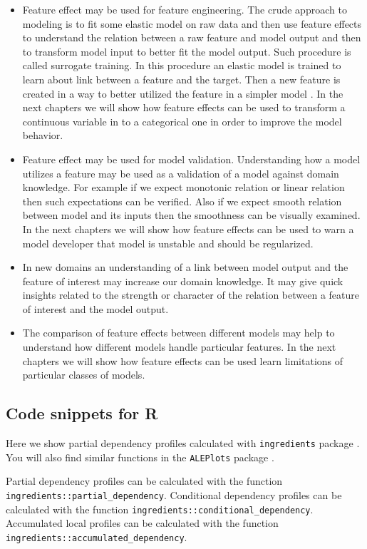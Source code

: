 \documentclass[12pt,]{krantz}
\providecommand{\tightlist}{%
  \setlength{\itemsep}{0pt}\setlength{\parskip}{0pt}}
\begin{document}
\begin{itemize}
\tightlist
\item
  Feature effect may be used for feature engineering. The crude approach to modeling is to fit some elastic model on raw data and then use feature effects to understand the relation between a raw feature and model output and then to transform model input to better fit the model output. Such procedure is called surrogate training. In this procedure an elastic model is trained to learn about link between a feature and the target. Then a new feature is created in a way to better utilized the feature in a simpler model \citep{SAFE-arxiv}. In the next chapters we will show how feature effects can be used to transform a continuous variable in to a categorical one in order to improve the model behavior.
\item
  Feature effect may be used for model validation. Understanding how a model utilizes a feature may be used as a validation of a model against domain knowledge. For example if we expect monotonic relation or linear relation then such expectations can be verified. Also if we expect smooth relation between model and its inputs then the smoothness can be visually examined. In the next chapters we will show how feature effects can be used to warn a model developer that model is unstable and should be regularized.
\item
  In new domains an understanding of a link between model output and the feature of interest may increase our domain knowledge. It may give quick insights related to the strength or character of the relation between a feature of interest and the model output.
\item
  The comparison of feature effects between different models may help to understand how different models handle particular features. In the next chapters we will show how feature effects can be used learn limitations of particular classes of models.
\end{itemize}

\hypertarget{ALPR}{%
\subsection{Code snippets for R}\label{ALPR}}

Here we show partial dependency profiles calculated with \texttt{ingredients} package \citep{ingredientsRPackage}. You will also find similar functions in the \texttt{ALEPlots} package \citep{ALEPlotRPackage}.

Partial dependency profiles can be calculated with the function \texttt{ingredients::partial\_dependency}.
Conditional dependency profiles can be calculated with the function \texttt{ingredients::conditional\_dependency}.
Accumulated local profiles can be calculated with the function \texttt{ingredients::accumulated\_dependency}.
\end{document}
